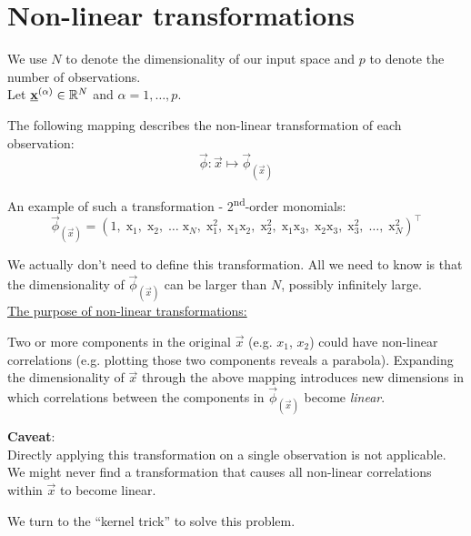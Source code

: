 
\section{Non-linear transformations}

We use $N$ to denote the dimensionality of our input space and $p$ to denote the number of observations.\\
Let $\underline{\mathbf{x}}^{(\alpha)} \in \mathbb{R}^N$ and $\alpha = 1, \ldots, p$.

The following mapping describes the non-linear transformation of each observation:
$$
\vec{\phi}: \vec{x} \mapsto \vec{\phi}_{(\vec{x})}
$$

An example of such a transformation - 2\textsuperscript{nd}-order monomials:
$$
\vec{\phi}_{(\vec{x})} = ( 
    1, \;
    \mathrm{x}_1, \;
    \mathrm{x}_2, \;
    \ldots \;
    \mathrm{x}_N, \;
    \mathrm{x}_1^2, \; 
    \mathrm{x}_1 \mathrm{x}_2, \;
    \mathrm{x}_2^2, \;
    \mathrm{x}_1 \mathrm{x}_3, \;
    \mathrm{x}_2 \mathrm{x}_3, \;
    \mathrm{x}_3^2, \; \ldots, \;
    \mathrm{x}_N^2
    )^\top
$$

We actually don't need to define this transformation.
All we need to know is that the dimensionality of $\vec{\phi}_{(\vec{x})}$ can be larger than $N$, possibly infinitely large.\\

\underline{The purpose of non-linear transformations:}

Two or more components in the original $\vec x$ (e.g. $x_1$, $x_2$) could have non-linear correlations (e.g. plotting those two components reveals a parabola). 
Expanding the dimensionality of $\vec x$ through the above mapping introduces new dimensions in which correlations between the components in $\vec \phi_{(\vec x)}$ become \emph{linear}.

\textbf{Caveat}:\\
Directly applying this transformation on a single observation is not applicable. 
We might never find a transformation that causes all non-linear correlations within $\vec x$ to become linear.

We turn to the ``kernel trick'' to solve this problem.
